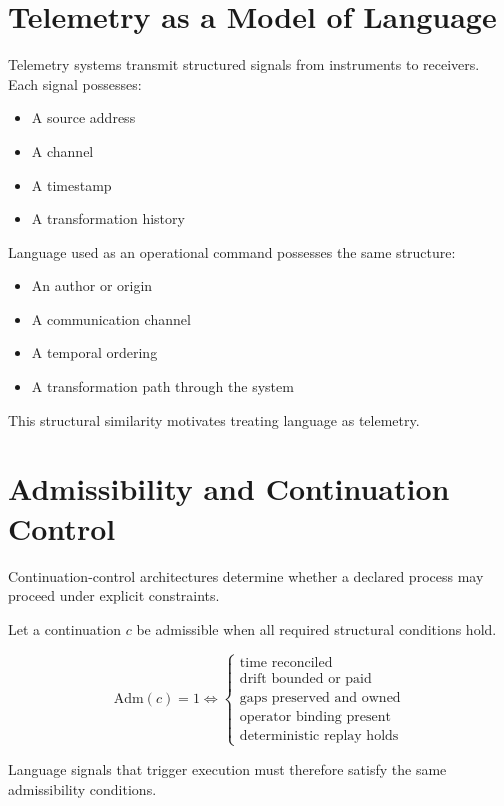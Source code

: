 \documentclass[11pt]{article}
\begin{document}
\section{Telemetry as a Model of Language}

Telemetry systems transmit structured signals from instruments to receivers. 
Each signal possesses:

\begin{itemize}
\item A source address
\item A channel
\item A timestamp
\item A transformation history
\end{itemize}

Language used as an operational command possesses the same structure:

\begin{itemize}
\item An author or origin
\item A communication channel
\item A temporal ordering
\item A transformation path through the system
\end{itemize}

This structural similarity motivates treating language as telemetry. \cite{shannon1948}

\section{Admissibility and Continuation Control}

Continuation-control architectures determine whether a declared process may proceed under explicit constraints. \cite{bookbinder2026a,bookbinder2026b,bookbinder2026c,bookbinder2026d}

Let a continuation $c$ be admissible when all required structural conditions hold.

\[
\mathrm{Adm}(c) = 1 \iff
\begin{cases}
\text{time reconciled} \\
\text{drift bounded or paid} \\
\text{gaps preserved and owned} \\
\text{operator binding present} \\
\text{deterministic replay holds}
\end{cases}
\]

Language signals that trigger execution must therefore satisfy the same admissibility conditions.
\end{document}
